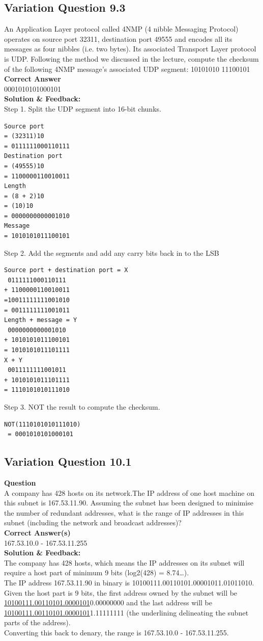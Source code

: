 \subsection{Variation Question 9.3}

An Application Layer protocol called 4NMP (4 nibble Messaging Protocol) 
operates on source port 32311, destination port 49555 and encodes all 
its messages as four nibbles (i.e. two bytes). Its associated Transport 
Layer protocol is UDP. Following the method we discussed in the lecture, 
compute the checksum of the following 4NMP message’s associated 
UDP segment:
10101010 
11100101\\
\textbf{Correct Answer}\\
0001010101000101 \\
\textbf{Solution \& Feedback:}\\
    
Step 1. Split the UDP segment into 16-bit chunks. 
\begin{lstlisting}
Source port 
= (32311)10
= 0111111000110111
Destination port
= (49555)10
= 1100000110010011
Length 
= (8 + 2)10
= (10)10
= 0000000000001010
Message
= 1010101011100101
\end{lstlisting}
Step 2. Add the segments and add any carry bits back in to the LSB
\begin{lstlisting}
Source port + destination port = X
 0111111000110111
+ 1100000110010011
=10011111111001010
= 0011111111001011
Length + message = Y
 0000000000001010
+ 1010101011100101
= 1010101011101111
X + Y
 0011111111001011
+ 1010101011101111
= 1110101010111010
\end{lstlisting}
Step 3. NOT the result to compute the checksum.
\begin{lstlisting}
NOT(1110101010111010)
 = 0001010101000101
\end{lstlisting}
\subsection{Variation Question 10.1}

\textbf{Question}\\
A company has 428 hosts on its network.The IP address of one host 
machine on this subnet is 167.53.11.90. Assuming the subnet has been 
designed to minimise the number of redundant addresses, what is the 
range of IP addresses in this subnet (including the network and broadcast 
addresses)?\\
\textbf{Correct Answer(s)}\\
167.53.10.0 - 167.53.11.255\\
\textbf{Solution \& Feedback:}\\
The company has 428 hosts, which means the IP addresses on its subnet will require a 
host part of minimum 9 bits (log2(428) = 8.74…).\\ 
The IP address 167.53.11.90 in binary is 10100111.00110101.00001011.01011010.
Given the host part is 9 bits, the first address owned by the subnet will be 
\underline{10100111.00110101.0000101}0.00000000 and the last address will be 
\underline{10100111.00110101.0000101}1.11111111 (the underlining delineating the subnet parts 
of the address). \\
Converting this back to denary, the range is 167.53.10.0 - 167.53.11.255. 
